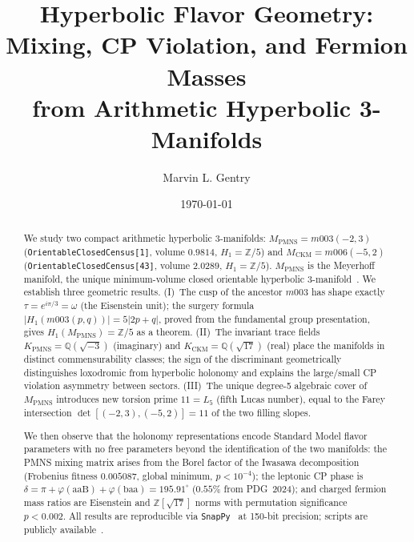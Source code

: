 \documentclass[11pt,a4paper]{article}
\theoremstyle{definition}
\theoremstyle{remark}
\newcommand{\ZZ}{\mathbb{Z}}
\newcommand{\QQ}{\mathbb{Q}}
\newcommand{\Zfive}{\mathbb{Z}/5}
\newcommand{\MPMNS}{M_{\mathrm{PMNS}}}
\newcommand{\MCKM}{M_{\mathrm{CKM}}}
\newcommand{\KPMNS}{K_{\mathrm{PMNS}}}
\newcommand{\KCKM}{K_{\mathrm{CKM}}}
\begin{document}
\title{Hyperbolic Flavor Geometry:\\
Mixing, CP Violation, and Fermion Masses\\
from Arithmetic Hyperbolic 3-Manifolds}

\author[1]{Marvin L. Gentry}
\date{\today}
\maketitle

\begin{abstract}
We study two compact arithmetic hyperbolic 3-manifolds:
$\MPMNS = m003(-2,3)$ (\texttt{OrientableClosedCensus[1]},
volume $0.9814$, $H_1=\Zfive$) and
$\MCKM = m006(-5,2)$ (\texttt{OrientableClosedCensus[43]},
volume $2.0289$, $H_1=\Zfive$).
$\MPMNS$ is the Meyerhoff manifold, the unique minimum-volume
closed orientable hyperbolic 3-manifold~\cite{GMM}.
We establish three geometric results.
(I)~The cusp of the ancestor $m003$ has shape exactly
$\tau = e^{i\pi/3} = \omega$ (the Eisenstein unit); the surgery
formula $|H_1(m003(p,q))| = 5|2p+q|$, proved from the fundamental
group presentation, gives $H_1(\MPMNS) = \ZZ/5$ as a theorem.
(II)~The invariant trace fields
$\KPMNS = \QQ(\sqrt{-3})$ (imaginary) and
$\KCKM = \QQ(\sqrt{17})$ (real) place the manifolds in distinct
commensurability classes; the sign of the discriminant geometrically
distinguishes loxodromic from hyperbolic holonomy and explains
the large/small CP violation asymmetry between sectors.
(III)~The unique degree-5 algebraic cover of $\MPMNS$ introduces
new torsion prime $11 = L_5$ (fifth Lucas number), equal to the
Farey intersection $\det[(-2,3),(-5,2)] = 11$ of the two filling slopes.

We then observe that the holonomy representations encode
Standard Model flavor parameters with no free parameters beyond
the identification of the two manifolds:
the PMNS mixing matrix arises from the Borel factor of the
Iwasawa decomposition (Frobenius fitness $0.005087$, global minimum,
$p<10^{-4}$);
the leptonic CP phase is $\delta = \pi + \varphi(\mathrm{aaB})
+ \varphi(\mathrm{baa}) = 195.91^\circ$ ($0.55\%$ from PDG~2024);
and charged fermion mass ratios are Eisenstein and $\ZZ[\sqrt{17}]$
norms with permutation significance $p<0.002$.
All results are reproducible via \texttt{SnapPy}~\cite{SnapPy}
at 150-bit precision; scripts are publicly available~\cite{GitHub}.
\end{abstract}
\end{document}
